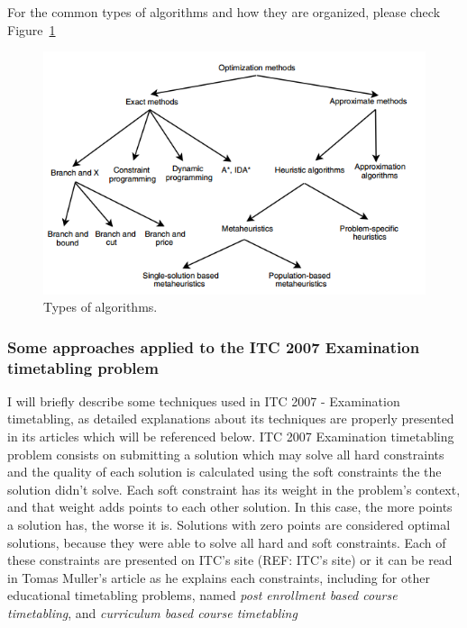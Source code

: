 For the common types of algorithms and how they are organized, please check Figure~\ref{fig:TypesAlgorithms}

\begin{figure}[h!]
 \centering
   \includegraphics{./images/types_of_algorithms.png}
   \caption{Types of algorithms.}
   \label{fig:TypesAlgorithms}
\end{figure}


\subsubsection{Some approaches applied to the ITC 2007 Examination timetabling problem}
\label{subsection:ApprITC2007}

I will briefly describe some techniques used in ITC 2007 - Examination timetabling, as detailed explanations about its techniques are properly presented in its articles which will be referenced below. ITC 2007 Examination timetabling problem consists on submitting a solution which may solve all hard constraints and the quality of each solution is calculated using the soft constraints the the solution didn't solve. Each soft constraint has its weight in the problem's context, and that weight adds points to each other solution. In this case, the more points a solution has, the worse it is. Solutions with zero points are considered optimal solutions, because they were able to solve all hard and soft constraints. Each of these constraints are presented on ITC's site (REF: ITC's site) or it can be read in Tomas Muller's article as he explains each constraints, including for other educational timetabling problems, named \textit{post enrollment based course timetabling}, and \textit{curriculum based course timetabling}\\
\\

